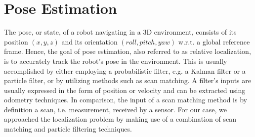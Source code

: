 


\section{Pose Estimation} \label{pose_estimation}

The pose, or state, of a robot navigating in a 3D environment, consists of
its position $(x, y, z)$ and its orientation $(roll, pitch, yaw)$ w.r.t.
a global reference frame.
Hence, the goal of pose estimation, also referred to as relative localization,
is to accurately track the robot's pose in the environment.
This is usually accomplished by either employing a probabilistic filter,
e.g. a Kalman filter or a particle filter, or by utilizing methods such
as scan matching.
A filter's inputs are usually expressed in the form of position or velocity
and can be extracted using odometry techniques.
In comparison, the input of a scan matching method is by definition a
scan, i.e. measurement, received by a sensor.
For our case, we approached the localization problem by making use of a
combination of scan matching and particle filtering techniques.

